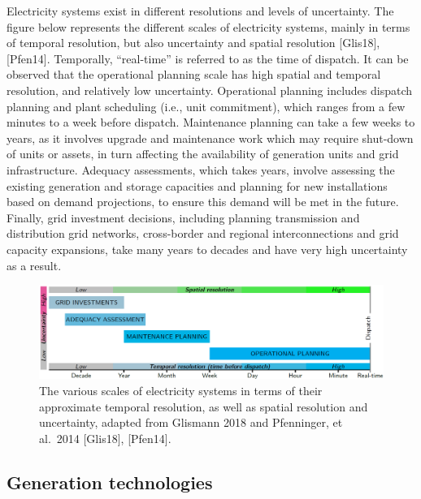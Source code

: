 Electricity systems exist in different resolutions and levels of
uncertainty. The figure below represents the different scales of
electricity systems, mainly in terms of temporal resolution, but also
uncertainty and spatial resolution {[}Glis18{]}, {[}Pfen14{]}.
Temporally, ``real-time'' is referred to as the time of dispatch. It can
be observed that the operational planning scale has high spatial and
temporal resolution, and relatively low uncertainty. Operational
planning includes dispatch planning and plant scheduling (i.e., unit
commitment), which ranges from a few minutes to a week before dispatch.
Maintenance planning can take a few weeks to years, as it involves
upgrade and maintenance work which may require shut-down of units or
assets, in turn affecting the availability of generation units and grid
infrastructure. Adequacy assessments, which takes years, involve
assessing the existing generation and storage capacities and planning
for new installations based on demand projections, to ensure this demand
will be met in the future. Finally, grid investment decisions, including
planning transmission and distribution grid networks, cross-border and
regional interconnections and grid capacity expansions, take many years
to decades and have very high uncertainty as a result.

\begin{figure}
\centering
\includegraphics{images/resolution.png}
\caption{The various scales of electricity systems in terms of their
approximate temporal resolution, as well as spatial resolution and
uncertainty, adapted from Glismann 2018 and Pfenninger, et al.~2014
{[}Glis18{]}, {[}Pfen14{]}.}
\end{figure}

\hypertarget{generation-technologies}{%
\subsection{Generation technologies}\label{generation-technologies}}

